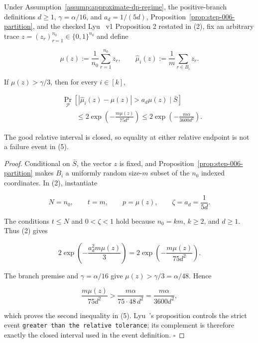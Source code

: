 \begin{lemma}\label{lem:step-006-high-tail}
Under Assumption~\ref{assump:approximate-dp-regime}, the positive-branch
definitions \(d\geq1\), \(\gamma=\alpha/16\), and \(a_d=1/(5d)\),
Proposition~\ref{prop:step-006-partition}, and the checked Lyu~\citep{lyu2025} v1
Proposition 2 restated in (2), fix an arbitrary trace
\(z=(z_r)_{r=1}^{n_0}\in\{0,1\}^{n_0}\) and define

\[
 \mu(z):=\frac1{n_0}\sum_{r=1}^{n_0}z_r,
 \qquad
 \widehat\mu_i(z):=\frac1m\sum_{r\in B_i}z_r.
\tag{4}
\]

If \(\mu(z)>\gamma/3\), then for every \(i\in[k]\),

\[
\begin{aligned}
 &\Pr_{\mathcal P}
 \left[|\widehat\mu_i(z)-\mu(z)|>a_d\mu(z)\mid\bar S\right]\\
 &\qquad\leq
 2\exp\!\left(-\frac{m\mu(z)}{75d^2}\right)
 \leq
 2\exp\!\left(-\frac{m\alpha}{3600d^2}\right).
\end{aligned}
\tag{5}
\]

The good relative interval is closed, so equality at either relative
endpoint is not a failure event in (5).


\end{lemma}

\begin{proof}
Conditional on \(\bar S\), the vector \(z\) is fixed, and
Proposition~\ref{prop:step-006-partition} makes \(B_i\) a uniformly random
size-\(m\) subset of the \(n_0\) indexed coordinates.  In (2), instantiate

\[
 N=n_0,\qquad t=m,\qquad p=\mu(z),\qquad \zeta=a_d=\frac1{5d}.
\]

The conditions \(t\leq N\) and \(0<\zeta<1\) hold because
\(n_0=km\), \(k\geq2\), and \(d\geq1\).  Thus (2) gives

\[
 2\exp\!\left(-\frac{a_d^2m\mu(z)}3\right)
 =2\exp\!\left(-\frac{m\mu(z)}{75d^2}\right).
\]

The branch premise and \(\gamma=\alpha/16\) give
\(\mu(z)>\gamma/3=\alpha/48\).  Hence

\[
 \frac{m\mu(z)}{75d^2}
 >\frac{m\alpha}{75\cdot48\,d^2}
 =\frac{m\alpha}{3600d^2},
\]

which proves the second inequality in (5).  Lyu~\citep{lyu2025}'s proposition controls the
strict event \texttt{greater than the relative tolerance}; its complement is
therefore exactly the closed interval used in the event definition.
\(\square\)


\end{proof}

